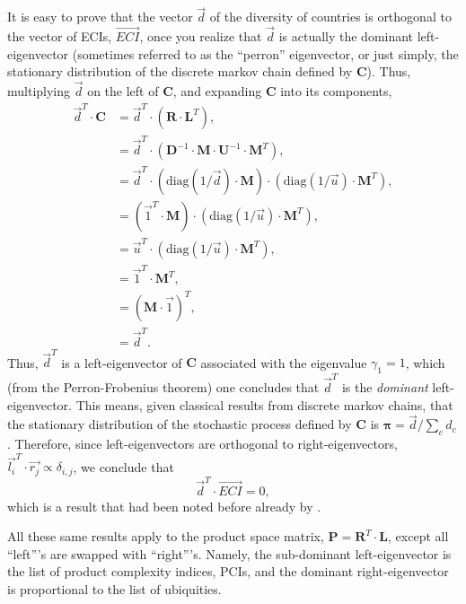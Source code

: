 \documentclass[12pt]{article}
\newcommand{\mtx}[1]{\mathbf{ #1}}
\newcommand{\diag}[1]{\mathrm{diag}\left( #1\right)}
\begin{document}
It is easy to prove that the vector $\vec{d}$ of the diversity of countries is orthogonal to the vector of ECIs, $\vec{ECI}$, once you realize that $\vec{d}$ is actually the dominant left-eigenvector (sometimes referred to as the ``perron'' eigenvector, or just simply, the stationary distribution of the discrete markov chain defined by $\mtx{C}$). Thus, multiplying $\vec{d}$ on the left of $\mtx{C}$, and expanding $\mtx{C}$ into its components,
\begin{align}
    \vec{d}^T\cdot\mtx{C} &= \vec{d}^T\cdot(\mtx{R}\cdot\mtx{L}^T), \nonumber \\
    &= \vec{d}^T\cdot(\mtx{D}^{-1}\cdot\mtx{M}\cdot\mtx{U}^{-1}\cdot\mtx{M}^T), \nonumber \\
    &= \vec{d}^T\cdot(\diag{1/\vec{d}}\cdot \mtx{M})\cdot(\diag{1/\vec{u}}\cdot\mtx{M}^T), \nonumber \\
    &= (\vec{1}^T\cdot\mtx{M})\cdot(\diag{1/\vec{u}}\cdot\mtx{M}^T), \nonumber \\
    &= \vec{u}^T\cdot(\diag{1/\vec{u}}\cdot\mtx{M}^T), \nonumber \\
    &= \vec{1}^T\cdot\mtx{M}^T, \nonumber \\
		&= (\mtx{M}\cdot\vec{1})^T, \nonumber\\
    &= \vec{d}^T.
\end{align}
Thus, $\vec{d}^T$ is a left-eigenvector of $\mtx{C}$ associated with the eigenvalue $\gamma_1=1$, which (from the Perron-Frobenius theorem) one concludes that $\vec{d}^T$ is the \emph{dominant} left-eigenvector. This means, given classical results from discrete markov chains, that the stationary distribution of the stochastic process defined by $\mtx{C}$ is ${\boldsymbol \pi} = \vec{d}/\sum_c d_c$. Therefore, since left-eigenvectors are orthogonal to right-eigenvectors, $\vec{l_i}^T \cdot \vec{r_j}\propto\delta_{i,j}$, we conclude that $$\vec{d}^T\cdot\vec{ECI}=0,$$ which is a result that had been noted before already by \citet{kemp2014interpretation}.

All these same results apply to the product space matrix, $\mtx{P} = \mtx{R}^T\cdot \mtx{L}$, except all ``left'''s are swapped with ``right'''s. Namely, the sub-dominant left-eigenvector is the list of product complexity indices, PCIs, and the dominant right-eigenvector is proportional to the list of ubiquities.
\end{document}
